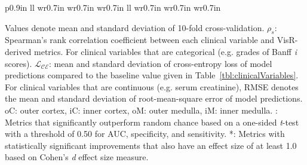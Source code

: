 \begin{landscape}
\begin{longtable}{
        p{0.9in} 
        ll w{r}{0.7in} w{r}{0.7in} w{r}{0.7in}
        ll w{r}{0.7in} w{r}{0.7in} w{r}{0.7in}
    }
        \bottomrule
    \end{longtable}
    \par\vspace{0.5em}
    \noindent{}Values denote mean and standard deviation of 10-fold cross-validation. $\rho_{s}$: Spearman's rank correlation coefficient between each clinical variable and VisR-derived metrics. For clinical variables that are categorical (e.g. grades of Banff \emph{i} scores). $\mathscr{L_{\textrm{CE}}}$: mean and standard deviation of cross-entropy loss of model predictions compared to the baseline value given in Table~\ref{tbl:clinicalVariables}. For clinical variables that are continuous (e.g. serum creatinine), RMSE denotes the mean and standard deviation of root-mean-square error of model predictions. oC: outer cortex, iC: inner cortex, oM: outer medulla, iM: inner medulla. \textdagger{}: Metrics that significantly outperform random chance based on a one-sided \emph{t}-test with a threshold of 0.50 for AUC, specificity, and sensitivity. *: Metrics with statistically significant improvements that also have an effect size of at least 1.0 based on Cohen's \emph{d} effect size measure.
\end{landscape}
